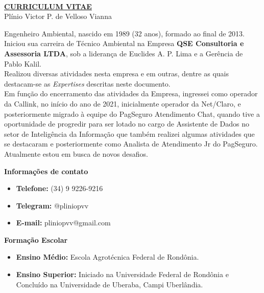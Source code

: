 \documentclass[12pt,a4paper,oneside,sumario=tradicional,brazil]{abntex2}
\begin{document}

\

\vspace{5cm}
\begin{center}
	\textbf{\underline{{\HUGE CURRICULUM VITAE}}} \\
	\vspace{1cm}
	{\large Plínio Victor P. de Velloso Vianna}	
\end{center}

\newpage
\textual

Engenheiro Ambiental, nascido em 1989 (32 anos), formado ao final de 2013. Iniciou sua carreira de Técnico Ambiental na Empresa \textbf{QSE Consultoria e Assessoria LTDA}, sob a liderança de Euclides A. P. Lima e a Gerência de Pablo Kalil. \\
\indent
Realizou diversas atividades nesta empresa e em outras, dentre as quais destacam-se as \textit{Expertises} descritas neste documento. \\
\indent
Em função do encerramento das atividades da Empresa, ingressei como operador da Callink, no início do ano de 2021, inicialmente operador da Net/Claro, e posteriormente migrado à equipe do PagSeguro Atendimento Chat, quando tive a oportunidade de progredir para ser lotado no cargo de Assistente de Dados no setor de Inteligência da Informação que também realizei algumas atividades que se destacaram e posteriormente como Analista de Atendimento Jr do PagSeguro. \\
Atualmente estou em busca de novos desafios.

\begin{center}
	\textbf{{\Large Informações de contato}} \\
\end{center}
\begin{itemize}
	\item \textbf{Telefone:} (34) 9 9226-9216 \\
	\vspace{-1cm}
	\item \textbf{Telegram:} @pliniopvv \\
	\vspace{-1cm}
	\item \textbf{E-mail:} pliniopvv@gmail.com \\
\end{itemize}


\begin{center}
	\textbf{{\Large Formação Escolar}} \\
\end{center}
\begin{itemize}
	\item \textbf{Ensino Médio:} Escola Agrotécnica Federal de Rondônia. \\
	\vspace{-1cm}
	\item \textbf{Ensino Superior:} Iniciado na Universidade Federal de Rondônia e Concluído na Universidade de Uberaba, Campi Uberlândia. \\
\end{itemize}
\end{document}
